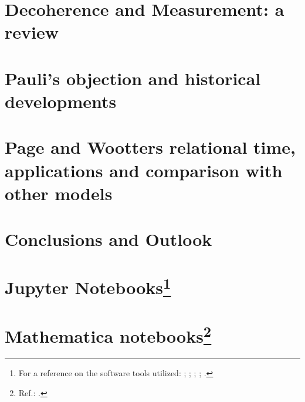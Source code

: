 \chapter{Decoherence and Measurement: a review}\label{ch:decohere}









\chapter{Pauli's objection and historical developments}\label{ch:hist}






\chapter{Page and Wootters relational time, applications and comparison with other models}
  \label{ch:pw}\label{ch:detect}









\chapter{Conclusions and Outlook}\label{ch:outlook}




\appendix

\chapter[Jupyter Notebooks]{Jupyter Notebooks\footnote{
  For a reference on the software tools utilized:
  \cite{comp:scipy};
  \cite{comp:sympy};
  \cite{comp:jupyter};
  \cite{comp:matplotlib};
  \cite{comp:numpy}.
}}






\chapter[Mathematica notebooks]{Mathematica notebooks\footnote{
  Ref.: \cite{Wolfram}.
}}



\printbibliography[heading=bibintoc]


